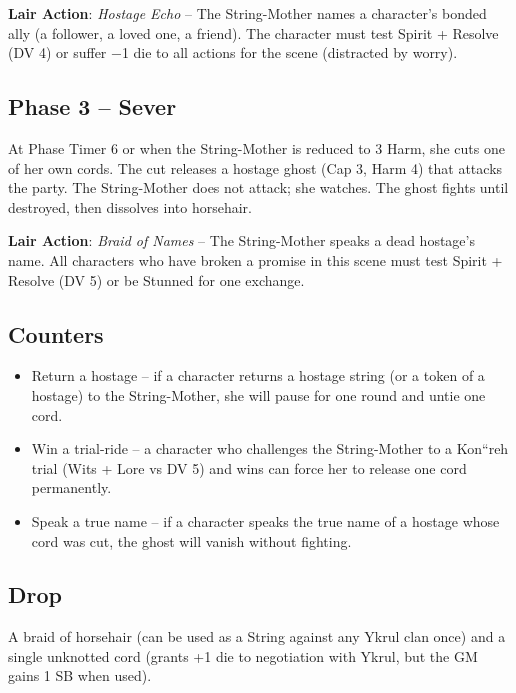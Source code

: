 \noindent\textbf{Lair Action}: \emph{Hostage Echo} -- The String-Mother names a character's bonded ally (a follower, a loved one, a friend). The character must test Spirit + Resolve (DV 4) or suffer −1 die to all actions for the scene (distracted by worry).

\subsection*{Phase 3 -- Sever}

\noindent At Phase Timer 6 or when the String-Mother is reduced to 3 Harm, she cuts one of her own cords. The cut releases a hostage ghost (Cap 3, Harm 4) that attacks the party. The String-Mother does not attack; she watches. The ghost fights until destroyed, then dissolves into horsehair.

\noindent\textbf{Lair Action}: \emph{Braid of Names} -- The String-Mother speaks a dead hostage's name. All characters who have broken a promise in this scene must test Spirit + Resolve (DV 5) or be Stunned for one exchange.

\subsection*{Counters}

\begin{itemize}
    \item Return a hostage -- if a character returns a hostage string (or a token of a hostage) to the String-Mother, she will pause for one round and untie one cord.
    \item Win a trial-ride -- a character who challenges the String-Mother to a Kon``reh trial (Wits + Lore vs DV 5) and wins can force her to release one cord permanently.
    \item Speak a true name -- if a character speaks the true name of a hostage whose cord was cut, the ghost will vanish without fighting.
\end{itemize}

\subsection*{Drop}
\noindent A braid of horsehair (can be used as a String against any Ykrul clan once) and a single unknotted cord (grants +1 die to negotiation with Ykrul, but the GM gains 1 SB when used).


